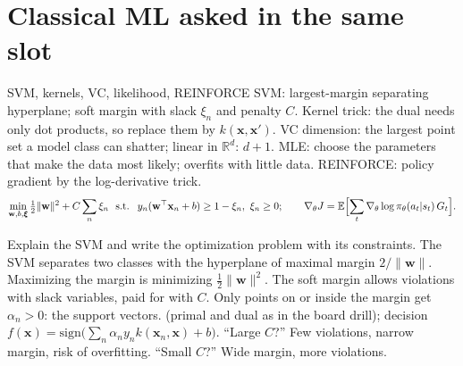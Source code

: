 \section{Classical ML asked in the same slot}

\begin{summary}{SVM, kernels, VC, likelihood, REINFORCE}
\textsf{SVM:} largest-margin separating hyperplane; soft margin with slack $\xi_n$ and penalty $C$.
\textsf{Kernel trick:} the dual needs only dot products, so replace them by $k(\mathbf{x},\mathbf{x}')$.
\textsf{VC dimension:} the largest point set a model class can shatter; linear in $\mathbb{R}^d$: $d+1$.
\textsf{MLE:} choose the parameters that make the data most likely; overfits with little data.
\textsf{REINFORCE:} policy gradient by the log-derivative trick.
\[
\min_{\mathbf{w},b,\bm\xi}\tfrac12\lVert\mathbf{w}\rVert^2+C\sum_n\xi_n\ \text{ s.t. }\ y_n(\mathbf{w}^\top\mathbf{x}_n+b)\ge1-\xi_n,\ \xi_n\ge0;
\qquad
\nabla_\theta J=\mathbb{E}\Bigl[\sum_t\nabla_\theta\log\pi_\theta(a_t|s_t)\,G_t\Bigr].
\]
\end{summary}



\begin{qabox}{\asked Explain the SVM and write the optimization problem with its constraints.}
\ans The SVM separates two classes with the hyperplane of maximal margin $2/\lVert\mathbf{w}\rVert$.
Maximizing the margin is minimizing $\frac12\lVert\mathbf{w}\rVert^2$. The soft margin allows
violations with slack variables, paid for with $C$. Only points on or inside the margin get
$\alpha_n>0$: the support vectors.
\formula (primal and dual as in the board drill); decision $f(\mathbf{x})=\mathrm{sign}\bigl(\sum_n\alpha_ny_nk(\mathbf{x}_n,\mathbf{x})+b\bigr)$.
\follow ``Large $C$?'' Few violations, narrow margin, risk of overfitting. ``Small $C$?'' Wide
margin, more violations.
\end{qabox}

